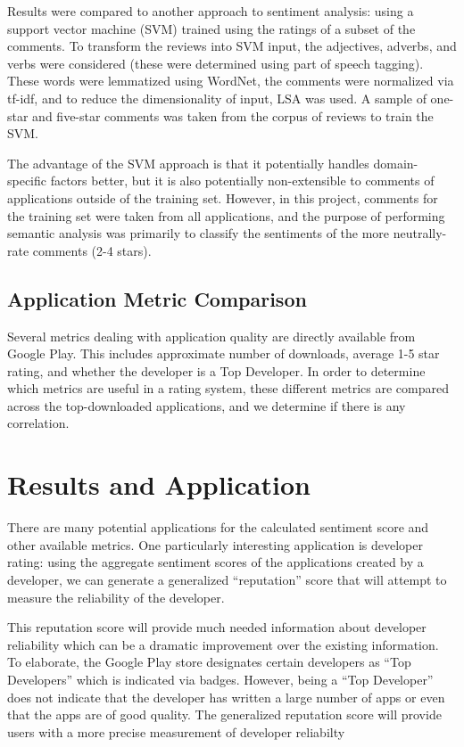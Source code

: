 \documentclass{acm_proc_article-sp}
\begin{document}
Results were compared to another approach to sentiment analysis: using a support vector machine (SVM) trained using the ratings of a subset of the comments.  To transform the reviews into SVM input, the adjectives, adverbs, and verbs were considered (these were determined using part of speech tagging).  These words were lemmatized using WordNet, the comments were normalized via tf-idf, and to reduce the dimensionality of input, LSA was used.  A sample of one-star and five-star comments was taken from the corpus of reviews to train the SVM.

The advantage of the SVM approach is that it potentially handles domain-specific factors better, but it is also potentially non-extensible to comments of applications outside of the training set.  However, in this project, comments for the training set were taken from all applications, and the purpose of performing semantic analysis was primarily to classify the sentiments of the more neutrally-rate comments (2-4 stars).


\subsection{Application Metric Comparison}
Several metrics dealing with application quality are directly available from Google Play.  This includes approximate number of downloads, average 1-5 star rating, and whether the developer is a Top Developer.  In order to determine which metrics are useful in a rating system, these different metrics are compared across the top-downloaded applications, and we determine if there is any correlation.

\section{Results and Application}\label{results}
There are many potential applications for the calculated sentiment score and other available metrics. One particularly interesting application is developer rating: using the aggregate sentiment scores of the applications created by a developer, we can generate a generalized ``reputation'' score that will attempt to measure the reliability of the developer.

 This reputation score will provide much needed information about developer reliability which can be a dramatic improvement over the existing information. To elaborate, the Google Play store designates certain developers as ``Top Developers'' which is indicated via badges. However, being a ``Top Developer'' does not indicate that the developer has written a large number of apps or even that the apps are of good quality. The generalized reputation score will provide users with a more precise measurement of developer reliabilty
\end{document}
